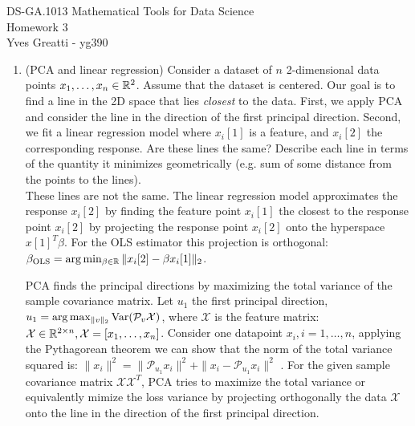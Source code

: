 \documentclass[12pt,twoside]{article}
\begin{document}
\noindent DS-GA.1013 Mathematical Tools for Data Science \\
Homework 3 \\
Yves Greatti - yg390\\

\begin{enumerate}
\item (PCA and linear regression) Consider a dataset of $n$ 2-dimensional data points $x_1,\ldots,x_n \in \mathbb{R}^2$. Assume that the dataset is centered. Our goal is to find a line in the 2D space that lies \emph{closest} to the data. First, we apply PCA and consider the line in the direction of the first principal direction. Second, we fit a linear regression model where $x_i[1]$ is a feature, and $x_i[2]$ the corresponding response. Are these lines the same? Describe each line in terms of the quantity it minimizes geometrically (e.g. sum of some distance from the points to the lines).\\

	These lines are not the same. The linear regression model approximates the response $x_i[2]$ by  finding the feature point  $x_i[1]$  the closest to the response point $x_i[2]$ by projecting the response point $x_i[2]$
	onto the hyperspace $x[1]^T \beta $. For the OLS estimator this projection is orthogonal: $\beta_{\text{OLS}} =  \arg \min_{\beta \in \mathbb{R}} \| x_i[2] - \beta x_i[1] \|_2$.
	
	PCA finds the principal directions by maximizing the total variance of the sample covariance matrix.
	Let $u_1$ the first principal direction, $u_1 = \arg \max_{\|v\|_2} \var(\mathcal{P}_v \mathcal{X})$, where $\mathcal{X}$ is the feature matrix: $\mathcal{X} \in \mathbb{R}^{2 \times n}, \mathcal{X} = [ x_1,\ldots,x_n ]$.
	Consider one datapoint $x_i, i=1, \ldots,n$, applying the Pythagorean theorem we can show that the norm of the total variance squared is: 
	$\|x_i\|^2 = \| \mathcal{P}_{u_1} x_i\|^2 + \| x_i - \mathcal{P}_{u_1} x_i \|^2$ .
	For the given sample covariance  matrix $\mathcal{X} \mathcal{X}^T$, PCA tries to maximize the total variance or equivalently mimize the loss variance by projecting orthogonally the data  $\mathcal{X}$ onto the  line  in the direction of the first principal direction.
	
\newpage


\end{enumerate}
\end{document}
